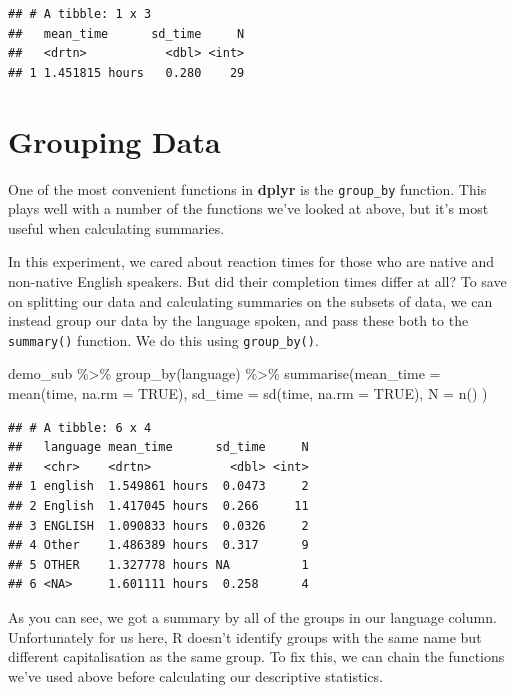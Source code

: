 \documentclass[
]{book}
\newenvironment{Shaded}{\begin{snugshade}}{\end{snugshade}}
\newcommand{\AttributeTok}[1]{\textcolor[rgb]{0.77,0.63,0.00}{#1}}
\newcommand{\ConstantTok}[1]{\textcolor[rgb]{0.00,0.00,0.00}{#1}}
\newcommand{\FunctionTok}[1]{\textcolor[rgb]{0.00,0.00,0.00}{#1}}
\newcommand{\NormalTok}[1]{#1}
\newcommand{\SpecialCharTok}[1]{\textcolor[rgb]{0.00,0.00,0.00}{#1}}
\begin{document}
\begin{verbatim}
## # A tibble: 1 x 3
##   mean_time      sd_time     N
##   <drtn>           <dbl> <int>
## 1 1.451815 hours   0.280    29
\end{verbatim}

\hypertarget{grouping-data}{%
\section{Grouping Data}\label{grouping-data}}

One of the most convenient functions in \textbf{dplyr} is the \texttt{group\_by} function. This plays well with a number of the functions we've looked at above, but it's most useful when calculating summaries.

In this experiment, we cared about reaction times for those who are native and non-native English speakers. But did their completion times differ at all? To save on splitting our data and calculating summaries on the subsets of data, we can instead group our data by the language spoken, and pass these both to the \texttt{summary()} function. We do this using \texttt{group\_by()}.

\begin{Shaded}
\begin{Highlighting}[]
\NormalTok{demo\_sub }\SpecialCharTok{\%\textgreater{}\%} 
  \FunctionTok{group\_by}\NormalTok{(language) }\SpecialCharTok{\%\textgreater{}\%}
  \FunctionTok{summarise}\NormalTok{(}\AttributeTok{mean\_time =} \FunctionTok{mean}\NormalTok{(time, }\AttributeTok{na.rm =} \ConstantTok{TRUE}\NormalTok{),}
           \AttributeTok{sd\_time =} \FunctionTok{sd}\NormalTok{(time, }\AttributeTok{na.rm =} \ConstantTok{TRUE}\NormalTok{),}
           \AttributeTok{N =} \FunctionTok{n}\NormalTok{()}
\NormalTok{           )}
\end{Highlighting}
\end{Shaded}

\begin{verbatim}
## # A tibble: 6 x 4
##   language mean_time      sd_time     N
##   <chr>    <drtn>           <dbl> <int>
## 1 english  1.549861 hours  0.0473     2
## 2 English  1.417045 hours  0.266     11
## 3 ENGLISH  1.090833 hours  0.0326     2
## 4 Other    1.486389 hours  0.317      9
## 5 OTHER    1.327778 hours NA          1
## 6 <NA>     1.601111 hours  0.258      4
\end{verbatim}

As you can see, we got a summary by all of the groups in our language column. Unfortunately for us here, R doesn't identify groups with the same name but different capitalisation as the same group. To fix this, we can chain the functions we've used above before calculating our descriptive statistics.
\end{document}
